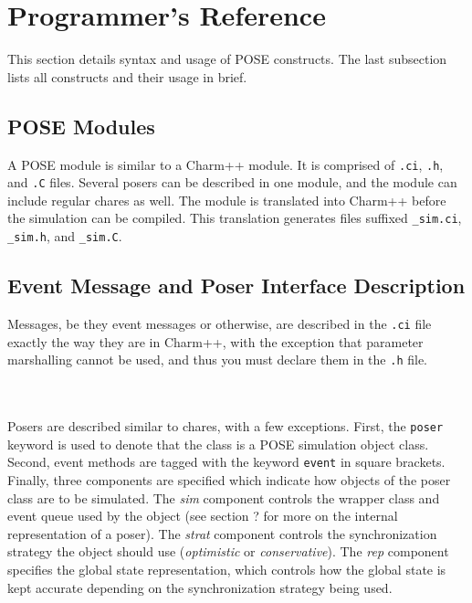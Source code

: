 \documentclass[10pt]{article}
\begin{document}
\section{Programmer's Reference}

This section details syntax and usage of POSE constructs.  The last
subsection lists all constructs and their usage in brief.

\subsection{POSE Modules}

A POSE module is similar to a Charm++ module.  It is comprised of 
{\tt .ci}, {\tt .h}, and {\tt .C} files.  Several posers can be
described in one module, and the module can include regular chares as
well.  The module is translated into Charm++ before the simulation can
be compiled.  This translation generates files suffixed {\tt \_sim.ci},
{\tt \_sim.h}, and {\tt \_sim.C}.  

\subsection{Event Message and Poser Interface Description}

Messages, be they event messages or otherwise, are described in the
{\tt .ci} file exactly the way they are in Charm++, with the exception
that parameter marshalling cannot be used, and thus you must declare
them in the {\tt .h} file.  

~\\
\\

Posers are described similar to chares, with a few exceptions.  First,
the {\tt poser} keyword is used to denote that the class is a POSE
simulation object class.  Second, event methods are tagged with the
keyword {\tt event} in square brackets. Finally, three components are
specified which indicate how objects of the poser class are to be
simulated.  The {\it sim} component controls the wrapper class and
event queue used by the object (see section ? for more on the internal
representation of a poser).  The {\it strat} component controls the
synchronization strategy the object should use ({\it optimistic} or
{\it conservative}).  The {\it rep} component specifies the global
state representation, which controls how the global state is kept
accurate depending on the synchronization strategy being used.
\end{document}
